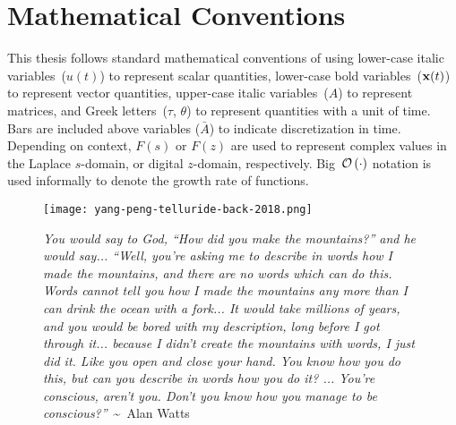 \cleardoublepage
\renewcommand\contentsname{Table of Contents}
\tableofcontents
\cleardoublepage
{}

\listoffigures
\cleardoublepage
{}

\listoftables
\cleardoublepage
{}

\listoftheorems[ignoreall,show={theorem,lemma}]
\cleardoublepage
{}

\chapter*{Mathematical Conventions}
\label{typography}

This thesis follows standard mathematical conventions of using lower-case italic variables~($u(t)$) to represent scalar quantities, lower-case bold variables~($\mathbf{x}(t)$) to represent vector quantities, upper-case italic variables~($A$) to represent matrices, and Greek letters~($\tau$, $\theta$) to represent quantities with a unit of time.
Bars are included above variables ($\bar{A}$) to indicate discretization in time.
Depending on context, $F(s)$ or $F(z)$ are used to represent complex values in the Laplace $s$-domain, or digital $z$-domain, respectively.
Big~$\mathcal{O}\left({\cdot}\right)$ notation is used informally to denote the growth rate of functions.

\cleardoublepage
{}

\begin{figure}
\centering
\vspace*{\fill}
\begingroup
\texttt{[image: yang-peng-telluride-back-2018.png]}
\endgroup

\vspace{1em} 

\caption*{{\tiny \emph{You would say to God, ``How did you make the mountains?'' and he would say... ``Well, you're asking me to describe in words how I made the mountains, and there are no words which can do this. Words cannot tell you how I made the mountains any more than I can drink the ocean with a fork... It would take millions of years, and you would be bored with my description, long before I got through it... because I didn't create the mountains with words, I just did it. Like you open and close your hand. You know how you do this, but can you describe in words how you do it? ... You're conscious, aren't you. Don't you know how you manage to be conscious?''}~\textasciitilde~Alan Watts}}

\vspace*{\fill}
\end{figure}

\cleardoublepage
{}

